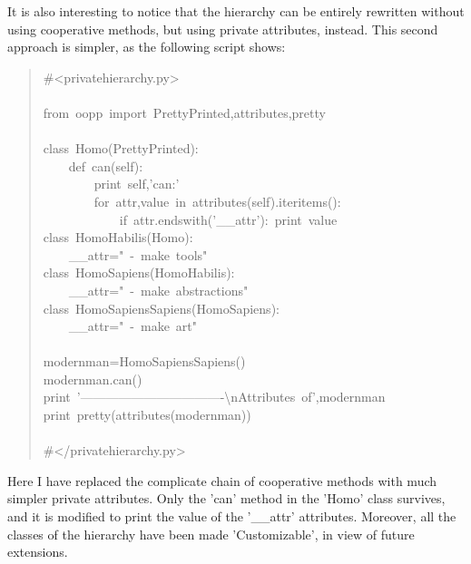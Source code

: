 \documentclass[10pt,english]{article}
\begin{document}
It is also interesting to notice that the hierarchy can be entirely
rewritten without using cooperative methods, but using private attributes,
instead. This second approach is simpler, as the following script shows:
\begin{quote}
\begin{ttfamily}\begin{flushleft}
\mbox{{\#}<privatehierarchy.py>}\\
\mbox{}\\
\mbox{from~oopp~import~PrettyPrinted,attributes,pretty}\\
\mbox{}\\
\mbox{class~Homo(PrettyPrinted):}\\
\mbox{~~~~def~can(self):}\\
\mbox{~~~~~~~~print~self,'can:'}\\
\mbox{~~~~~~~~for~attr,value~in~attributes(self).iteritems():~}\\
\mbox{~~~~~~~~~~~~if~attr.endswith('{\_}{\_}attr'):~print~value}\\
\mbox{class~HomoHabilis(Homo):~}\\
\mbox{~~~~{\_}{\_}attr="~-~make~tools"}\\
\mbox{class~HomoSapiens(HomoHabilis):~}\\
\mbox{~~~~{\_}{\_}attr="~-~make~abstractions"}\\
\mbox{class~HomoSapiensSapiens(HomoSapiens):~}\\
\mbox{~~~~{\_}{\_}attr="~-~make~art"}\\
\mbox{}\\
\mbox{modernman=HomoSapiensSapiens()}\\
\mbox{modernman.can()}\\
\mbox{print~'----------------------------------{\textbackslash}nAttributes~of',modernman}\\
\mbox{print~pretty(attributes(modernman))}\\
\mbox{}\\
\mbox{{\#}</privatehierarchy.py>}
\end{flushleft}\end{ttfamily}
\end{quote}

Here I have replaced the complicate chain of cooperative methods with 
much simpler private attributes. Only the 'can' method in the 'Homo' 
class survives, and it is modified to print the value of the '{\_}{\_}attr' 
attributes. Moreover, all the classes of the hierarchy have been made
'Customizable', in view of future extensions.
\end{document}
